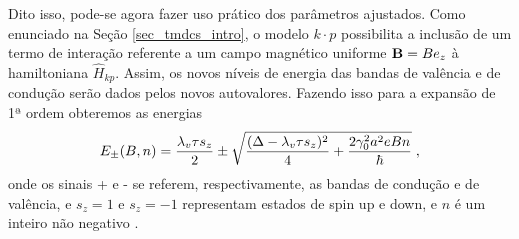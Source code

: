 Dito isso, pode-se agora fazer uso prático dos parâmetros ajustados. Como
enunciado na Seção \ref{sec_tmdcs_intro}, o modelo $ k \cdot p $ possibilita a
inclusão de um termo de interação referente a um campo magnético uniforme $
  \mathbf{B} = B e_z $ à hamiltoniana $ \hat{H}_{kp} $. Assim, os novos níveis de
energia das bandas de valência e de condução serão dados pelos novos
autovalores. Fazendo isso para a expansão de 1ª ordem obteremos as energias
\begin{equation}
  E_\pm (B, n) = \frac{\lambda_v \tau s_z}{2} \pm 
  \sqrt{
    \frac{(\Delta - \lambda_v \tau s_z)^2}{4} + 
    \frac{2 \gamma_0^2 a^2 e B n}{\hbar}
  }
  \;\mathrm{,}
  \label{eq:landau_levels}
\end{equation}
onde os sinais + e - se referem, respectivamente, as bandas de condução e de valência, e
$ s_z = 1 $ e $ s_z = -1 $ representam estados de spin up e down, e $n$ é um inteiro não
negativo \cite{dias2016tmdc}.

